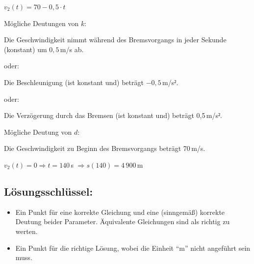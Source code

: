 \begin{langesbeispiel}
{\begin{enumerate}
	$v_2(t)=70-0,5\cdot t$\leer
	
	Mögliche Deutungen von $k$:
	
	Die Geschwindigkeit nimmt während des Bremsvorgangs in jeder Sekunde (konstant) um $0,5$\,m/s ab.\leer
	
	oder:
	
	Die Beschleunigung (ist konstant und) beträgt $-0,5$\,m/s$²$.\leer
	
	oder:
	
	Die Verzögerung durch das Bremsen (ist konstant und) beträgt 0,5\,m/s$²$.\leer
	
	Mögliche Deutung von $d$:
	
	Die Geschwindigkeit zu Beginn des Bremsvorgangs beträgt 70\,m/s.
	
	$v_2(t)=0 \Rightarrow t=140$\,s $\Rightarrow s(140)=4\,900$\,m

	\subsection{Lösungsschlüssel:}
	
\begin{itemize}
	\item Ein Punkt für eine korrekte Gleichung und eine (sinngemäß) korrekte Deutung beider Parameter. Äquivalente Gleichungen sind als richtig zu werten. 
	\item Ein Punkt für die richtige Lösung, wobei die Einheit "`m"' nicht angeführt sein muss.
\end{itemize}

\end{enumerate}}
		\end{langesbeispiel}